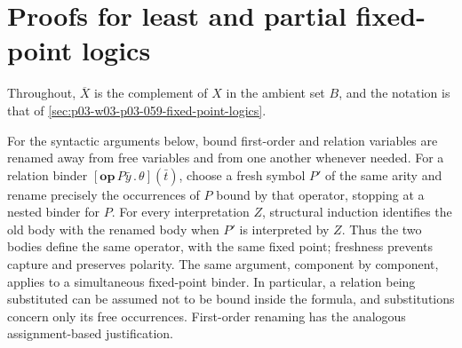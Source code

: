 \section{Proofs for least and partial fixed-point logics}
\label{sec:annex-p03-w03-p03-059-fixed-point-logics}

Throughout, \(\overline X\) is the complement of \(X\) in the ambient set
\(B\), and the notation is that of
\cref{sec:p03-w03-p03-059-fixed-point-logics}.

For the syntactic arguments below, bound first-order and relation variables
are renamed away from free variables and from one another whenever needed.
For a relation binder \([\mathbf{op}\,P\bar y\,.\,\theta](\bar t)\), choose
a fresh symbol \(P'\) of the same arity and rename precisely the
occurrences of \(P\) bound by that operator, stopping at a nested binder
for \(P\). For every interpretation \(Z\), structural induction identifies
the old body with the renamed body when \(P'\) is interpreted by \(Z\).
Thus the two bodies define the same operator, with the same fixed point;
freshness prevents capture and preserves polarity. The same argument,
component by component, applies to a simultaneous fixed-point binder.
In particular, a relation being substituted can be assumed not to be bound
inside the formula, and substitutions concern only its free occurrences.
First-order renaming has the analogous assignment-based justification.

